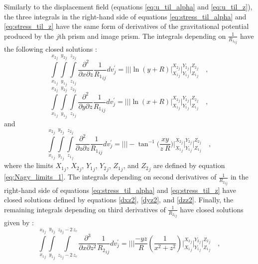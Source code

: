 \documentclass[journal abbreviation, manuscript]{copernicus}
\begin{document}
Similarly to the displacement field (equations \ref{eq:u_til_alpha} and \ref{eq:u_til_z}), the three integrals in the right-hand side of equations \ref{eq:stress_til_alpha} and \ref{eq:stress_til_z} have the same form of 
derivatives of the gravitational potential produced by the $j$th prism and image prism.
The integrals depending on $\frac{1}{{R_1}_{ij}}$ have the following closed 
solutions \citep{Nagyetal2000, Nagyetal2002}:
\begin{equation}
\int\limits_{{x_{1}}_{j}}^{{x_{2}}_{j}} \int\limits_{{y_{1}}_{j}}^{{y_{2}}_{j}} \int\limits_{{z_{1}}_{j}}^{{z_{2}}_{j}}
\frac{\partial^{2}  }{\partial x \partial z} {\frac{1}{{R_1}_{ij}}} dv_{j}^{\prime} = \Bigg|\Bigg|\Bigg| 
\ln(y + R)
\Bigg|_{{X_1}_{j}}^{{X_2}_{j}} \Bigg|_{{Y_1}_{j}}^{{Y_2}_{j}} \Bigg|_{{Z_1}_{j}}^{{Z_2}_{j}} \quad ,
\label{dxz1}
\end{equation}
\begin{equation}
\int\limits_{{x_{1}}_{j}}^{{x_{2}}_{j}} \int\limits_{{y_{1}}_{j}}^{{y_{2}}_{j}} \int\limits_{{z_{1}}_{j}}^{{z_{2}}_{j}}
\frac{\partial^{2}  }{\partial y \partial z} {\frac{1}{{R_1}_{ij}}} dv_{j}^{\prime} =
\Bigg|\Bigg|\Bigg|
\ln(x + R)
\Bigg|_{{X_1}_{j}}^{{X_2}_{j}} \Bigg|_{{Y_1}_{j}}^{{Y_2}_{j}} \Bigg|_{{Z_1}_{j}}^{{Z_2}_{j}} \quad ,
\label{dyz1}
\end{equation}
and
\begin{equation}
\int\limits_{{x_{1}}_{j}}^{{x_{2}}_{j}} \int\limits_{{y_{1}}_{j}}^{{y_{2}}_{j}} \int\limits_{{z_{1}}_{j}}^{{z_{2}}_{j}}
\frac{\partial^{2}  }{\partial z \partial z} {\frac{1}{{R_1}_{ij}}} dv_{j}^{\prime} =
\Bigg|\Bigg|\Bigg|
-   \tan^{-1} \Bigg( \frac{xy}{z \: R} \Bigg)
\Bigg|_{{X_1}_{j}}^{{X_2}_{j}} \Bigg|_{{Y_1}_{j}}^{{Y_2}_{j}} \Bigg|_{{Z_1}_{j}}^{{Z_2}_{j}} \quad ,
\label{dzz1}
\end{equation}
where the limits ${X_1}_{j}$, ${X_2}_{j}$, ${Y_1}_{j}$, ${Y_2}_{j}$, ${Z_1}_{j}$, and ${Z_2}_{j}$ are defined by equation \ref{eq:Nagy_limits_1}.
The integrals depending on second derivatives of $\frac{1}{{R_2}_{ij}}$ in the 
right-hand side of equations \ref{eq:stress_til_alpha} and \ref{eq:stress_til_z} 
have closed solutions defined by equations \ref{dxz2}, \ref{dyz2}, and \ref{dzz2}.
Finally, the remaining integrals depending on third derivatives of 
$\frac{1}{{R_2}_{ij}}$ have closed solutions given by 
\citep{Nagyetal2000, Nagyetal2002}:
\begin{equation}
\int\limits_{{x_{1}}_{j}}^{{x_{2}}_{j}} \int\limits_{{y_{1}}_{j}}^{{y_{2}}_{j}} \int\limits_{{z_{1}}_{j} - 2 \, z_c}^{{z_{2}}_{j} - 2 \, z_c}
\frac{\partial^{3}}{\partial x \partial z^{2}} {\frac{1}{{R_2}_{ij}}} dv_{j}^{\prime} =
\Bigg|\Bigg|\Bigg| 
\frac{- y z}{R} 
\left( \frac{1}{x^{2} + z^{2}} \right)
\Bigg|_{{X_1}_{j}}^{{X_2}_{j}} \Bigg|_{{Y_1}_{j}}^{{Y_2}_{j}} \Bigg|_{{Z_1}_{j}}^{{Z_2}_{j}} \quad ,
\label{sxzz}
\end{equation}
\end{document}
